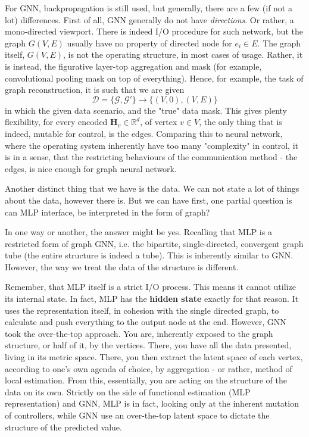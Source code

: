 \documentclass{article}
\begin{document}
For GNN, backpropagation is still used, but generally, there are a few (if not a lot) differences. First of all, GNN generally do not have \textit{directions}. Or rather, a mono-directed viewport. There is indeed I/O procedure for such network, but the graph $G(V,E)$ usually have no property of directed node for $e_{i}\in E$. The graph itself, $G(V,E)$, is not the operating structure, in most cases of usage. Rather, it is instead, the figurative layer-top aggregation and mask (for example, convolutional pooling mask on top of everything). Hence, for example, the task of graph reconstruction, it is such that we are given $$\mathcal{D}=\{ \mathcal{G},\mathcal{G}' \}\to \{ (V,0) , (V,E) \}$$
in which the given data scenario, and the "true" data mask. This gives plenty flexibility, for every encoded $\mathbf{H}_{v}\in \mathbb{R}^{d}$, of vertex $v\in V$, the only thing that is indeed, mutable for control, is the edges. Comparing this to neural network, where the operating system inherently have too many "complexity" in control, it is in a sense, that the restricting behaviours of the communication method - the edges, is nice enough for graph neural network. 


Another distinct thing that we have is the data. We can not state a lot of things about the data, however there is. But we can have first, one partial question is can MLP interface, be interpreted in the form of graph? 

In one way or another, the answer might be yes. Recalling that MLP is a restricted form of graph GNN, i.e. the bipartite, single-directed, convergent graph tube (the entire structure is indeed a tube). This is inherently similar to GNN. However, the way we treat the data of the structure is different. 

Remember, that MLP itself is a strict I/O process. This means it cannot utilize its internal state. In fact, MLP has the \textbf{hidden state} exactly for that reason. It uses the representation itself, in cohesion with the single directed graph, to calculate and push everything to the output node at the end. However, GNN took the over-the-top approach. You are, inherently exposed to the graph structure, or half of it, by the vertices. There, you have all the data presented, living in its metric space. There, you then extract the latent space of each vertex, according to one's own agenda of choice, by aggregation - or rather, method of local estimation. From this, essentially, you are acting on the structure of the data on its own. Strictly on the side of functional estimation (MLP representation) and GNN, MLP is in fact, looking only at the inherent mutation of controllers, while GNN use an over-the-top latent space to dictate the structure of the predicted value. 
\end{document}
